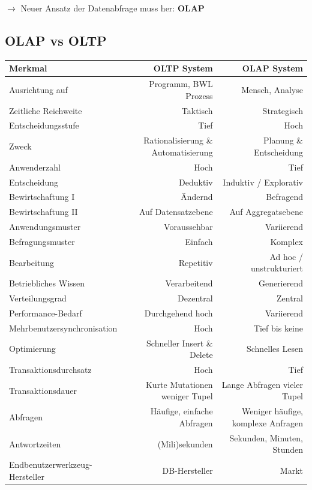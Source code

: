 \documentclass[a4paper, 11pt]{article}
\begin{document}
$\rightarrow$ Neuer Ansatz der Datenabfrage muss her: \textbf{OLAP}

\subsection{OLAP vs OLTP}

\begin{tabular}{|l|r|r|}
	\hline 
	Merkmal & OLTP System  & OLAP System  \\ 
	\hline 
	Ausrichtung auf & Programm, BWL Prozess & Mensch, Analyse\\ 
	\hline 
	Zeitliche Reichweite & Taktisch & Strategisch \\ 
	\hline 
	Entscheidungsstufe & Tief & Hoch \\ 
	\hline
	Zweck & Rationalisierung \& Automatisierung & Planung \& Entscheidung \\
	\hline
	Anwenderzahl &Hoch & Tief \\
	\hline
	Entscheidung & Deduktiv & Induktiv / Explorativ \\
	\hline
	Bewirtschaftung I & Ändernd & Befragend \\
	\hline
	Bewirtschaftung II & Auf Datensatzebene & Auf Aggregatsebene \\
	\hline
	Anwendungsmuster & Voraussehbar & Variierend \\
	\hline
	Befragungsmuster & Einfach & Komplex \\
	\hline
	Bearbeitung & Repetitiv & Ad hoc / unstrukturiert \\
	\hline
	Betriebliches Wissen & Verarbeitend & Generierend \\
	\hline
	Verteilungsgrad & Dezentral & Zentral \\
	\hline
	Performance-Bedarf & Durchgehend hoch & Variierend \\
	\hline
	Mehrbenutzersynchronisation & Hoch & Tief bis keine \\
	\hline
	Optimierung & Schneller Insert \& Delete & Schnelles Lesen \\
	\hline
	Transaktionsdurchsatz & Hoch & Tief \\
	\hline
	Transaktionsdauer & Kurte Mutationen weniger Tupel & Lange Abfragen vieler Tupel \\
	\hline
	Abfragen & Häufige, einfache Abfragen & Weniger häufige, komplexe Anfragen \\
	\hline
	Antwortzeiten & (Mili)sekunden & Sekunden, Minuten, Stunden \\
	\hline
	Endbenutzerwerkzeug-Hersteller & DB-Hersteller & Markt \\

\end{tabular}
\end{document}
